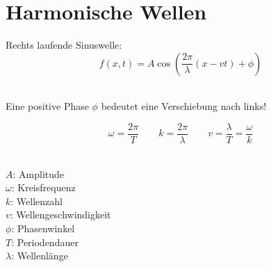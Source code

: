 \section{Harmonische Wellen}
Rechts laufende Sinuswelle:
\[\boxed{
	f(x,t) = A\cos \left( \frac{2\pi}{\lambda} (x-vt)+\phi \right)
}\]
\\
\begin{footnotesize}
	Eine positive Phase $\phi$ bedeutet eine Verschiebung nach links!
\end{footnotesize}
\[\boxed{
	\omega = \frac{2\pi}{T} \qquad k = \frac{2\pi}{\lambda} \qquad v = \frac{\lambda}{T} = \frac{\omega}{k}
}\]
\\
\begin{footnotesize}
	$A$: Amplitude\\
	$\omega$: Kreisfrequenz\\
	$k$: Wellenzahl\\
	$v$: Wellengeschwindigkeit\\
	$\phi$: Phasenwinkel\\
	$T$: Periodendauer\\
	$\lambda$: Wellenlänge
\end{footnotesize}


